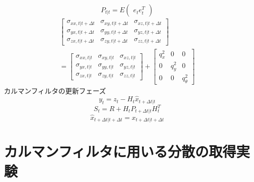 \documentclass[a4paper]{article}
\begin{document}
\begin{equation}
    P_{t|t} = E
    \begin{pmatrix}
        e_{t} e_{t}^{T}
    \end{pmatrix}
    \label{eq:5}
\end{equation}
%
%
\begin{equation}
    \begin{split}
    \begin{bmatrix}
    \sigma_{xx,t|t+\Delta t} &\sigma_{xy,t|t+\Delta t} &\sigma_{xz,t|t+\Delta t} \\
    \sigma_{yx,t|t+\Delta t} &\sigma_{yy,t|t+\Delta t} &\sigma_{yz,t|t+\Delta t} \\
    \sigma_{zx,t|t+\Delta t} &\sigma_{zy,t|t+\Delta t} &\sigma_{zz,t|t+\Delta t} 
    \end{bmatrix} \\
    = 
    \begin{bmatrix}
        \sigma_{xx,t|t} &\sigma_{xy,t|t} &\sigma_{xz,t|t} \\
        \sigma_{yx,t|t} &\sigma_{yy,t|t} &\sigma_{yz,t|t} \\
        \sigma_{zx,t|t} &\sigma_{zy,t|t} &\sigma_{zz,t|t}
    \end{bmatrix} 
    +
    \begin{bmatrix}
        q_{x}^{2} &0         &0 \\
        0         &q_{y}^{2} &0 \\
        0         &0         &q_{\theta}^{2}
    \end{bmatrix}
\end{split}
    \label{eq:6} 
\end{equation}
%
%
 カルマンフィルタの更新フェーズ
\begin{equation}
    y_{t} = z_{t} - H_{t}\hat{x}_{t+\Delta t|t}
    \label{eq:7}
\end{equation}
%
%
\begin{equation}
    S_{t} = R + H_{t}P_{t+\Delta t|t}H_{t}^{T}
    \label{eq:8}
\end{equation}
%
%
\begin{equation}
    \hat{x}_{t+\Delta t|t+\Delta t} = x_{t+\Delta t|t+\Delta t}
    \label{eq:9}
\end{equation}


\section{カルマンフィルタに用いる分散の取得実験}
\end{document}

